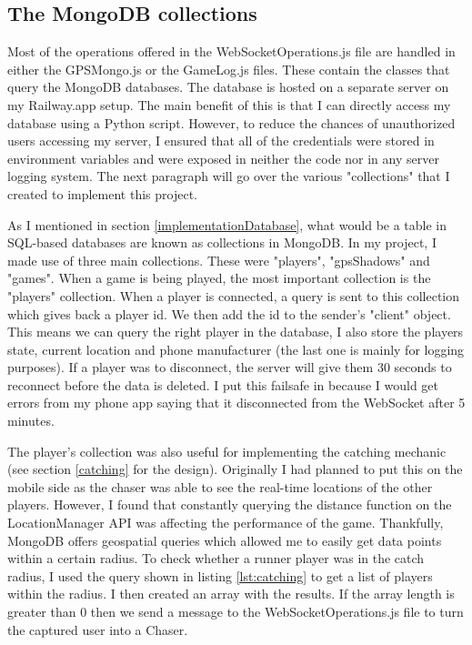 \documentclass{l4proj}
\begin{document}
\subsection{The MongoDB collections}
\label{mongocollections}
Most of the operations offered in the WebSocketOperations.js file are handled in either the GPSMongo.js or the GameLog.js
files. These contain the classes that query the MongoDB databases. The database is hosted on a separate
server on my Railway.app setup. The main benefit of this is that I can directly access my database using a Python
script. However, to reduce the chances of unauthorized users accessing my server, I ensured that all of the credentials
were stored in environment variables and were exposed in neither the code nor in any server logging system. The
next paragraph will go over the various "collections" that I created to implement this project.

As I mentioned in section \ref{implementationDatabase}, what would be a table in SQL-based databases are known as collections in MongoDB.
In my project, I made use of three main collections. These were "players", "gpsShadows" and "games". When a game is being played, the most
important collection is the "players" collection. When a player is connected, a query is sent to this collection which gives back a player id.
We then add the id to the sender's "client" object. This means we can query the right player in the database, I also store the players state,
current location and phone manufacturer (the last one is mainly for logging purposes). If a player was to disconnect, the server will give
them 30 seconds to reconnect before the data is deleted. I put this failsafe in because I would get errors from my phone app saying
that it disconnected from the WebSocket after 5 minutes.

The player's collection was also useful for implementing the catching mechanic (see section \ref{catching} for the design). Originally I had planned to put this on the mobile side
as the chaser was able to see the real-time locations of the other players. However, I found that constantly querying the distance function
on the LocationManager API was affecting the performance of the game. Thankfully, MongoDB offers geospatial queries which allowed me to
easily get data points within a certain radius. To check whether a runner player was in the catch radius, I used the query shown in
listing \ref{lst:catching} to get a list of players within the radius. I then created an array with the results. If the array length is greater
than 0 then we send a message to the WebSocketOperations.js file to turn the captured user into a Chaser.
\end{document}
